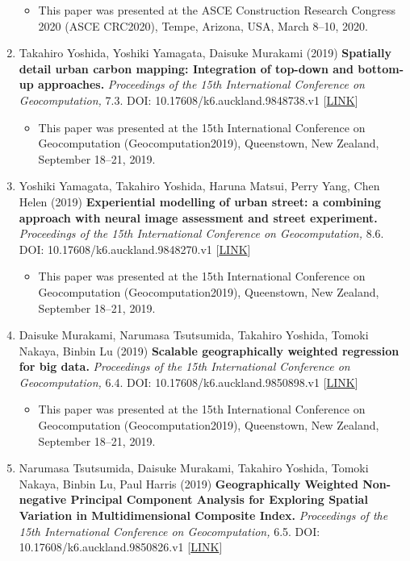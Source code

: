 \documentclass[]{book}
\providecommand{\tightlist}{%
  \setlength{\itemsep}{0pt}\setlength{\parskip}{0pt}}
\begin{document}
\begin{enumerate}
  \begin{itemize}
  \tightlist
  \item
    This paper was presented at the ASCE Construction Research Congress 2020 (ASCE CRC2020), Tempe, Arizona, USA, March 8--10, 2020.
  \end{itemize}
\item
  Takahiro Yoshida, Yoshiki Yamagata, Daisuke Murakami (2019)
  \textbf{Spatially detail urban carbon mapping: Integration of top-down and bottom-up approaches.}
  \emph{Proceedings of the 15th International Conference on Geocomputation,} 7.3.
  DOI: 10.17608/k6.auckland.9848738.v1 {[}\href{https://doi.org/10.17608/k6.auckland.9848738.v1}{LINK}{]}

  \begin{itemize}
  \tightlist
  \item
    This paper was presented at the 15th International Conference on Geocomputation (Geocomputation2019), Queenstown, New Zealand, September 18--21, 2019.
  \end{itemize}
\item
  Yoshiki Yamagata, Takahiro Yoshida, Haruna Matsui, Perry Yang, Chen Helen (2019)
  \textbf{Experiential modelling of urban street: a combining approach with neural image assessment and street experiment.}
  \emph{Proceedings of the 15th International Conference on Geocomputation,} 8.6.
  DOI: 10.17608/k6.auckland.9848270.v1 {[}\href{https://doi.org/10.17608/k6.auckland.9848270.v1}{LINK}{]}

  \begin{itemize}
  \tightlist
  \item
    This paper was presented at the 15th International Conference on Geocomputation (Geocomputation2019), Queenstown, New Zealand, September 18--21, 2019.
  \end{itemize}
\item
  Daisuke Murakami, Narumasa Tsutsumida, Takahiro Yoshida, Tomoki Nakaya, Binbin Lu (2019)
  \textbf{Scalable geographically weighted regression for big data.}
  \emph{Proceedings of the 15th International Conference on Geocomputation,} 6.4.
  DOI: 10.17608/k6.auckland.9850898.v1 {[}\href{https://doi.org/10.17608/k6.auckland.9850898.v1}{LINK}{]}

  \begin{itemize}
  \tightlist
  \item
    This paper was presented at the 15th International Conference on Geocomputation (Geocomputation2019), Queenstown, New Zealand, September 18--21, 2019.
  \end{itemize}
\item
  Narumasa Tsutsumida, Daisuke Murakami, Takahiro Yoshida, Tomoki Nakaya, Binbin Lu, Paul Harris (2019)
  \textbf{Geographically Weighted Non-negative Principal Component Analysis for Exploring Spatial Variation in Multidimensional Composite Index.}
  \emph{Proceedings of the 15th International Conference on Geocomputation,} 6.5.
  DOI: 10.17608/k6.auckland.9850826.v1 {[}\href{https://doi.org/10.17608/k6.auckland.9850826.v1}{LINK}{]}


\end{enumerate}
\end{document}
